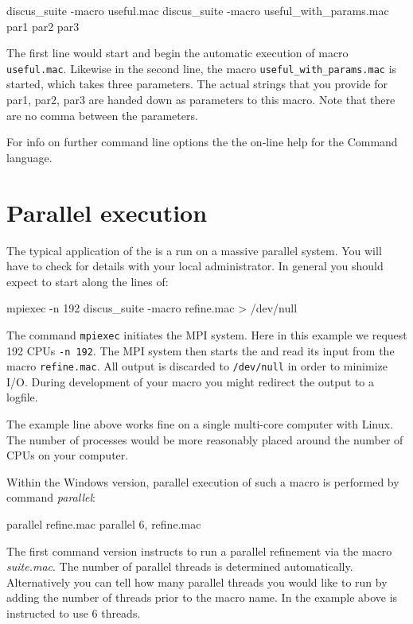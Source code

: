 \begin{MacVerbatim}
discus_suite -macro useful.mac
discus_suite -macro useful_with_params.mac  par1 par2 par3
\end{MacVerbatim}

The first line would start \Suite and begin the automatic execution
of macro {\tt useful.mac}. Likewise in the second line, the macro
{\tt useful\_with\_params.mac} is started, which takes three parameters. 
The actual strings that
you provide for par1, par2, par3 are handed down as parameters to
this macro. Note that there are no comma between the parameters.

For info on further command line options the the on-line help for
the Command language.

\section{Parallel execution \label{intro-par}}

The typical application of the \Suite is a run on a massive parallel 
system. You will have to check for details with your local administrator.
In general you should expect to start \Suite along the lines of:

\begin{MacVerbatim}
mpiexec -n 192 discus_suite -macro refine.mac > /dev/null
\end{MacVerbatim}

The command {\tt mpiexec} initiates the MPI system. Here in this example
we request 192 CPUs {\tt -n 192}. The MPI system then starts the \Suite
and read its input from the macro {\tt refine.mac}. All output is discarded
 to {\tt /dev/null} in order to minimize I/O. During development of your 
macro you might redirect the output to a logfile.

The example line above works fine on a single multi-core computer with 
Linux. The number of processes would be more reasonably placed around 
the number of CPUs on your computer.

Within the Windows version, parallel execution of such a macro is 
performed by \Suite command {\it parallel}:

\begin{MacVerbatim}
parallel refine.mac 
parallel 6, refine.mac 
\end{MacVerbatim}

The first command version instructs \Suite to run a parallel 
refinement via the macro {\it suite.mac}. The number of parallel 
threads is determined automatically. Alternatively you can tell 
\Suite how many parallel threads you would like to run by adding the
number of threads prior to the macro name. In the example above 
\Suite is instructed to use 6 threads.


